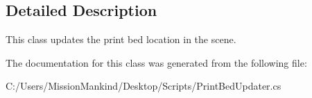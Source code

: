 \subsection{Detailed Description}
This class updates the print bed location in the scene. 



The documentation for this class was generated from the following file\+:\begin{DoxyCompactItemize}
\item 
C\+:/\+Users/\+Mission\+Mankind/\+Desktop/\+Scripts/Print\+Bed\+Updater.\+cs\end{DoxyCompactItemize}
